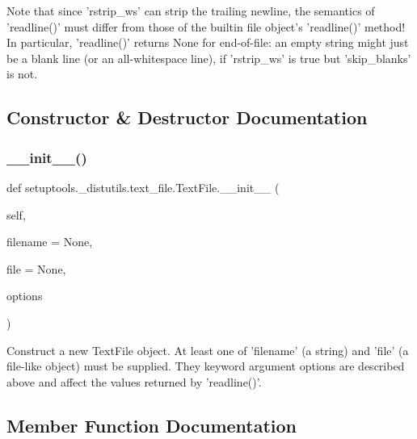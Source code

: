\begin{DoxyVerb}
   Note that since 'rstrip_ws' can strip the trailing newline, the
   semantics of 'readline()' must differ from those of the builtin file
   object's 'readline()' method!  In particular, 'readline()' returns
   None for end-of-file: an empty string might just be a blank line (or
   an all-whitespace line), if 'rstrip_ws' is true but 'skip_blanks' is
   not.\end{DoxyVerb}
 

\subsection{Constructor \& Destructor Documentation}
\mbox{\label{classsetuptools_1_1__distutils_1_1text__file_1_1TextFile_abd29417bf635e1fff86e41503372f26c}} 
\subsubsection{\texorpdfstring{\+\_\+\+\_\+init\+\_\+\+\_\+()}{\_\_init\_\_()}}
{\footnotesize\ttfamily def setuptools.\+\_\+distutils.\+text\+\_\+file.\+Text\+File.\+\_\+\+\_\+init\+\_\+\+\_\+ (\begin{DoxyParamCaption}\item[{}]{self,  }\item[{}]{filename = {\ttfamily None},  }\item[{}]{file = {\ttfamily None},  }\item[{}]{options }\end{DoxyParamCaption})}

\begin{DoxyVerb}Construct a new TextFile object.  At least one of 'filename'
   (a string) and 'file' (a file-like object) must be supplied.
   They keyword argument options are described above and affect
   the values returned by 'readline()'.\end{DoxyVerb}
 

\subsection{Member Function Documentation}
\mbox{\label{classsetuptools_1_1__distutils_1_1text__file_1_1TextFile_a93fc9674bb2e728766c41de29711e2fa}} 
